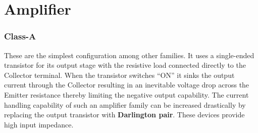 \documentclass[class=article,crop=false]{standalone}
\begin{document}
\twocolumn
\section{Amplifier}
\subsubsection*{Class-A }
These are the simplest configuration among other families. It uses a single-ended transistor for its output stage with the resistive load connected directly to the Collector terminal. When the transistor switches “ON” it sinks the output current through the Collector resulting in an inevitable voltage drop across the Emitter resistance thereby limiting the negative output capability.  The current handling capability of such an amplifier family can be increased drastically by replacing the output transistor with \textbf{Darlington pair}. These devices provide high input impedance.
\end{document}
